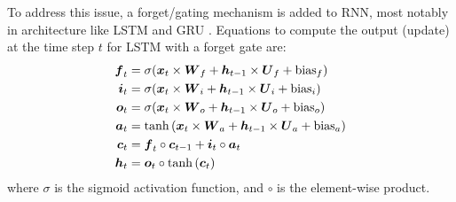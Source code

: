 To address this issue, a forget/gating mechanism is added to RNN, most notably
in architecture like LSTM \cite{lstm} and GRU \cite{gru}. Equations to compute
the output (update) at the time step $t$  for LSTM
with a forget gate are:
\begin{align}
  \boldsymbol{f}_t &= \sigma(\boldsymbol{x}_t \times \boldsymbol{W}_f + \boldsymbol{h}_{t-1} \times \boldsymbol{U}_f + \text{bias}_f)\\
  \boldsymbol{i}_t &= \sigma(\boldsymbol{x}_t \times \boldsymbol{W}_i + \boldsymbol{h}_{t-1} \times \boldsymbol{U}_i + \text{bias}_i)\\
  \boldsymbol{o}_t &= \sigma(\boldsymbol{x}_t \times \boldsymbol{W}_o + \boldsymbol{h}_{t-1} \times \boldsymbol{U}_o + \text{bias}_o)\\
  \boldsymbol{a}_t &= \tanh{(\boldsymbol{x}_t \times \boldsymbol{W}_a + \boldsymbol{h}_{t-1} \times \boldsymbol{U}_a + \text{bias}_a)}\\
  \boldsymbol{c}_t &= \boldsymbol{f}_t \circ \boldsymbol{c}_{t-1} + \boldsymbol{i}_t \circ \boldsymbol{a}_t \\
  \boldsymbol{h}_t &= \boldsymbol{o}_t \circ \tanh{(\boldsymbol{c}_t)}
\end{align}
where $\sigma$ is the sigmoid activation function, and $\circ$ is the
element-wise product.

